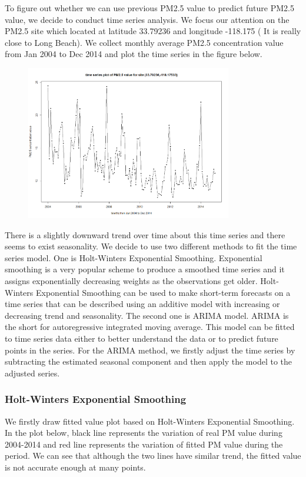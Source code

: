 
To figure out whether we can use previous PM2.5 value to predict future PM2.5 value, we decide to conduct time series analysis. We focus our attention on the PM2.5 site which located at latitude 33.79236 and longitude -118.175 ( It is really close to Long Beach). We collect monthly average PM2.5 concentration value from Jan 2004 to Dec 2014 and plot the time series in the figure below.

\begin{figure}[ht!]
\centering
\includegraphics[width = 90mm]{ts1.png}
\end{figure}

There is a slightly downward trend over time about this time series and there seems to exist seasonality. We decide to use two different methods to fit the time series model. One is Holt-Winters Exponential Smoothing. Exponential smoothing is a very popular scheme to produce a smoothed time series and it assigns exponentially decreasing weights as the observations get older. Holt-Winters Exponential Smoothing can be used to make short-term forecasts on a time series that can be described using an additive model with increasing or decreasing trend and seasonality. The second one is ARIMA model. ARIMA is the short for autoregressive integrated moving average. This model can be fitted to time series data either to better understand the data or to predict future points in the series. For the ARIMA method, we firstly adjust the time series by subtracting the estimated seasonal component and then apply the model to the adjusted series.



\subsubsection{Holt-Winters Exponential Smoothing}
We firstly draw fitted value plot based on Holt-Winters Exponential Smoothing. In the plot below, black line represents the variation of real PM value during 2004-2014 and red line represents the variation of fitted PM value during the period. We can see that although the two lines have similar trend, the fitted value is not accurate enough at many points.

